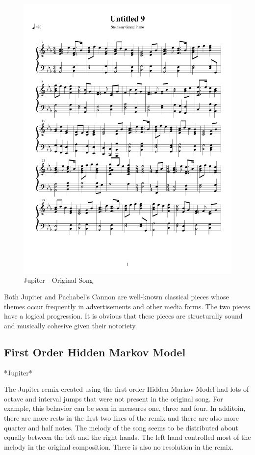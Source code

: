 \documentclass{article} %
\begin{document}
\begin{figure}[H]
\centering
\caption{Jupiter - Original Song}
\includegraphics [scale = 0.6] {JupiterOriginal-cropped.pdf}
\end{figure}

Both Jupiter and Pachabel's Cannon are well-known classical pieces whose themes occur frequently in advertisements and other media forms. The two pieces have a logical progression. It is obvious that these pieces are structurally sound and musically cohesive given their notoriety. 

\subsection{First Order Hidden Markov Model}

*Jupiter*

The Jupiter remix created using the first order Hidden Markov Model had lots of octave and interval jumps that were not present in the original song. For example, this behavior can be seen in measures one, three and four. In additoin, there are more rests in the first two lines of the remix and there are also more quarter and half notes. The melody of the song seems to be distributed about equally between the left and the right hands. The left hand controlled most of the melody in the original composition. There is also no resolution in the remix.
\end{document}
